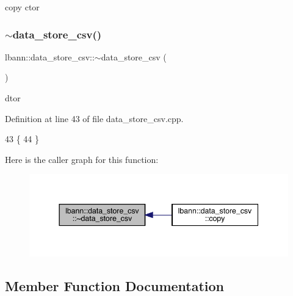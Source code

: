 copy ctor 

\mbox{\label{classlbann_1_1data__store__csv_a6e0928f649f9a808c4e73b77f34ffae3}} 
\subsubsection{\texorpdfstring{$\sim$data\+\_\+store\+\_\+csv()}{~data\_store\_csv()}}
{\footnotesize\ttfamily lbann\+::data\+\_\+store\+\_\+csv\+::$\sim$data\+\_\+store\+\_\+csv (\begin{DoxyParamCaption}{ }\end{DoxyParamCaption})\hspace{0.3cm}{\ttfamily [override]}}



dtor 



Definition at line 43 of file data\+\_\+store\+\_\+csv.\+cpp.


\begin{DoxyCode}
43                                 \{
44 \}
\end{DoxyCode}
Here is the caller graph for this function\+:\nopagebreak
\begin{figure}[H]
\begin{center}
\leavevmode
\includegraphics[width=344pt]{classlbann_1_1data__store__csv_a6e0928f649f9a808c4e73b77f34ffae3_icgraph}
\end{center}
\end{figure}


\subsection{Member Function Documentation}
\mbox{\label{classlbann_1_1data__store__csv_a2e95f53f539a838e6c6484b9f4de5a45}} 
